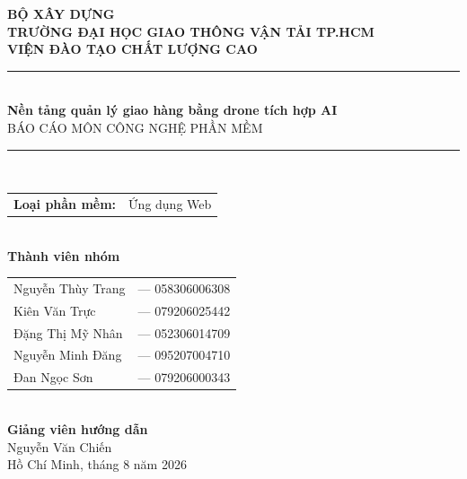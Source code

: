\documentclass[12pt, a4paper]{report}
\begin{document}
\begin{titlepage}
  \centering
  \vspace*{1cm}
  {\large\bfseries BỘ XÂY DỰNG}\\[0.3cm]
  {\large\bfseries TRƯỜNG ĐẠI HỌC GIAO THÔNG VẬN TẢI TP.HCM}\\[0.3cm]
  {\large\bfseries VIỆN ĐÀO TẠO CHẤT LƯỢNG CAO}\\[1.5cm]
  \rule{\linewidth}{1.5pt}\\[0.3cm]
  {\LARGE\bfseries Nền tảng quản lý giao hàng bằng drone tích hợp AI}\\[0.3cm]
  {\large BÁO CÁO MÔN CÔNG NGHỆ PHẦN MỀM}\\[0.3cm]
  \rule{\linewidth}{1.5pt}\\[1.5cm]
  \begin{tabular}{ll}
    \textbf{Loại phần mềm:} & Ứng dụng Web \\
  \end{tabular}\\[1.5cm]
  \textbf{Thành viên nhóm}\\[0.5cm]
  \begin{tabular}{ll}
    Nguyễn Thùy Trang & --- 058306006308 \\
    Kiên Văn Trực & --- 079206025442 \\
    Đặng Thị Mỹ Nhân & --- 052306014709 \\
    Nguyễn Minh Đăng & --- 095207004710 \\
    Đan Ngọc Sơn & --- 079206000343 \\
  \end{tabular}\\[1cm]
  \textbf{Giảng viên hướng dẫn}\\[0.3cm]
  Nguyễn Văn Chiến \\[0.5cm]

  \vfill
  {\large Hồ Chí Minh, tháng {8} năm {2026}}
\end{titlepage}

\tableofcontents
\clearpage
\clearpage

\setcounter{page}{1}
\end{document}
